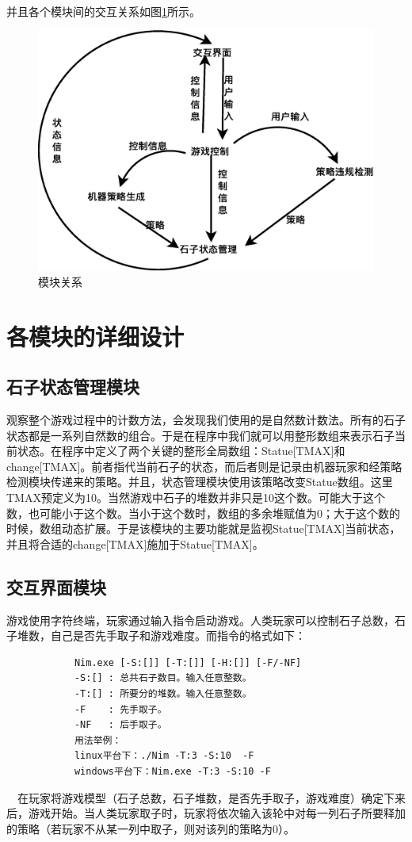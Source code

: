 \documentclass[UTF8,nofonts,cs4size]{ctexrep}
\begin{document}
\paragraph{}
并且各个模块间的交互关系如图\ref{module}所示。
\begin{figure}[htp]
\centering
\includegraphics[scale=0.42]{Message.eps}
\caption{模块关系}
\label{module}
\end{figure}

\section{各模块的详细设计}
\subsection{石子状态管理模块}
观察整个游戏过程中的计数方法，会发现我们使用的是自然数计数法。所有的石子状态都是一系列自然数的组合。于是在程序中我们就可以用整形数组来表示石子当前状态。在程序中定义了两个关键的整形全局数组：Statue[TMAX]和change[TMAX]。前者指代当前石子的状态，而后者则是记录由机器玩家和经策略检测模块传递来的策略。并且，状态管理模块使用该策略改变Statue数组。这里TMAX预定义为10。当然游戏中石子的堆数并非只是10这个数。可能大于这个数，也可能小于这个数。当小于这个数时，数组的多余堆赋值为0；大于这个数的时候，数组动态扩展。于是该模块的主要功能就是监视Statue[TMAX]当前状态，并且将合适的change[TMAX]施加于Statue[TMAX]。
\subsection{交互界面模块}
游戏使用字符终端，玩家通过输入指令启动游戏。人类玩家可以控制石子总数，石子堆数，自己是否先手取子和游戏难度。而指令的格式如下：
\begin{lstlisting}
            Nim.exe [-S:[]] [-T:[]] [-H:[]] [-F/-NF]
            -S:[] : 总共石子数目。输入任意整数。
            -T:[] : 所要分的堆数。输入任意整数。
            -F    : 先手取子。
            -NF   : 后手取子。
            用法举例：
            linux平台下：./Nim -T:3 -S:10  -F
            windows平台下：Nim.exe -T:3 -S:10 -F
\end{lstlisting}
\indent
\ \
在玩家将游戏模型（石子总数，石子堆数，是否先手取子，游戏难度）确定下来后，游戏开始。当人类玩家取子时，玩家将依次输入该轮中对每一列石子所要释加的策略（若玩家不从某一列中取子，则对该列的策略为0）。
\end{document}
